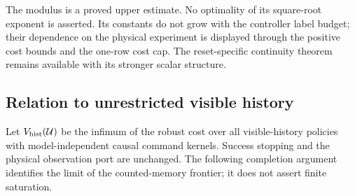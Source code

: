 The modulus is a proved upper estimate.  No optimality of its
square-root exponent is asserted.  Its constants do not grow with
the controller label budget; their dependence on the physical
experiment is displayed through the positive cost bounds and the
one-row cost cap.  The reset-specific continuity theorem remains
available with its stronger scalar structure.

\subsection{Relation to unrestricted visible history}

Let $V_{\rm hist}(\mathcal U)$ be the infimum of the robust cost
over all visible-history policies with model-independent causal
command kernels.  Success stopping and the physical observation
port are unchanged.  The following completion argument identifies
the limit of the counted-memory frontier; it does not assert
finite saturation.

